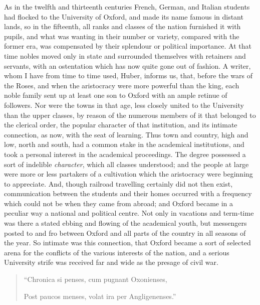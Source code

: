 As in the twelfth and
thirteenth centuries French, German, and Italian students had flocked
to the University of Oxford, and made its name famous in distant
lands, so in the fifteenth, all ranks and classes of the nation
furnished it with pupils, and what was wanting in their number or
variety, compared with the former era, was compensated by their
splendour or political importance. At that time nobles moved only in
state and surrounded themselves with retainers and servants, with an
ostentation which has now quite gone out of fashion. A writer, whom I
have from time to time used, Huber, informs us, that, before the wars
of the Roses, and when the aristocracy were more powerful than the
king, each noble family sent up at least one son to Oxford with an
ample retinue of followers. Nor were the towns in that age, less
closely united to the University than the upper classes, by reason of
the numerous members of it that belonged to the clerical order, the
popular character of that institution, and its intimate connection, as
now, with the seat of learning. Thus town and country, high and low,
north and south, had a common stake in the academical institutions,
and took a personal interest in the academical proceedings. The
degree possessed a sort of indelible \emph{character}, which all
classes understood; and the people at large were more or less
partakers of a cultivation which the aristocracy were beginning to
appreciate. And, though railroad travelling certainly did not then
exist, communication between the students and their homes occurred
with a frequency which could not be when they came from abroad; and
Oxford became in a peculiar way a national and political centre. Not
only in vacations and term-time was there a stated ebbing and flowing
of the academical youth, but messengers posted to and fro between
Oxford and all parts of the country in all seasons of the year. So
intimate was this connection, that Oxford became a sort of selected
arena for the conflicts of the various interests of the nation, and a
serious University strife was received far and wide as the presage of
civil war.

\begin{quote}

``Chronica si penses, cum
pugnant Oxonienses,

Post paucos menses, volat ira per Angligenenses.''

\end{quote}

